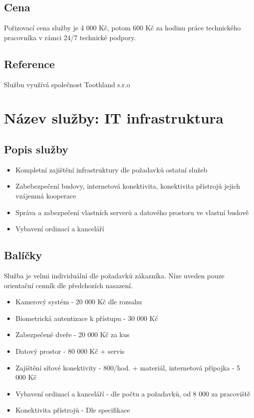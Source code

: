 \documentclass[12pt, a4paper, titlepage]{article}
\begin{document}
	\subsection*{Cena}
	Pořizovací cena služby je 4 000 Kč, potom 600 Kč za hodinu práce technického pracovníka v rámci 24/7 technické podpory.

	\subsection*{Reference}
	Službu využívá společnost Toothland s.r.o

	\newpage

	\noindent\makebox[\linewidth]{\rule{16cm}{0.4pt}}

	\section*{Název služby: IT infrastruktura}

	\subsection*{Popis služby}
	\begin{itemize}
		\item Kompletní zajištění infrastruktury dle požadavků ostatní služeb
		\item Zabebezpečení budovy, internetová konektivita, konektivita přístrojů jejich vzájemná kooperace
		\item Správa a zabezpečení vlastních serverů a datového prostoru ve vlastní budově
		\item Vybavení ordinací a kanceláří
	\end{itemize}

	\subsection*{Balíčky}
	Služba je velmi individuální dle požadavků zákazníka. Níze uveden pouze orientační cenník dle předchozích nasazení. 

	\begin{itemize}
		\item Kamerový systém - 20 000 Kč dle rozsahu
		\item Biometrická autentizace k přístupu - 30 000 Kč
		\item Zabezpečené dveře - 20 000 Kč za kus
		\item Datový prostor - 80 000 Kč + servis
		\item Zajištění síťové konektivity - 800/hod. + materiál, internetová přípojka - 5 000 Kč
		\item Vybavení ordinací a kanceláří - dle počtu a požadavků, od 8 000 za pracoviště
		\item Konektivita přístrojů - Dle specifikace
	\end{itemize}
\end{document}
